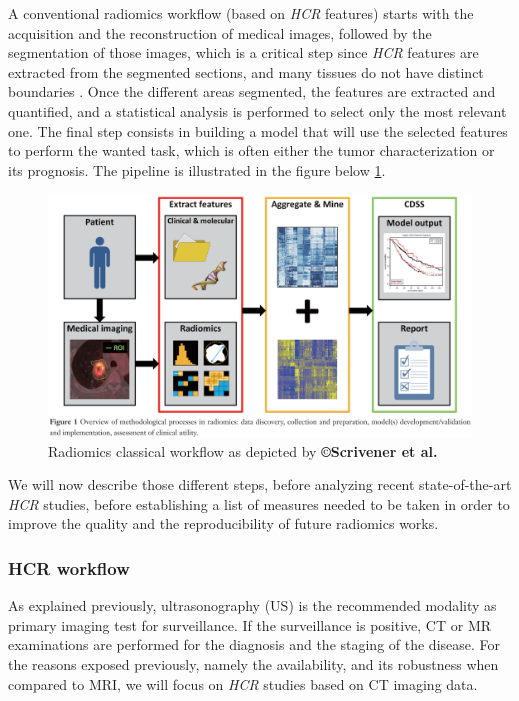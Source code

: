 \documentclass[]{article}
\begin{document}
A conventional radiomics workflow (based on \emph{HCR} features) starts
with the acquisition and the reconstruction of medical images, followed
by the segmentation of those images, which is a critical step since
\emph{HCR} features are extracted from the segmented sections, and many
tissues do not have distinct boundaries \cite{Gillies2016}. Once the different areas segmented, the features are
extracted and quantified, and a statistical analysis is performed to
select only the most relevant one. The final step consists in building a
model that will use the selected features to perform the wanted task,
which is often either the tumor characterization or its prognosis. The
pipeline is illustrated in the figure below \ref{Scrivener2016_Fig1}.


\begin{figure}[th!]
\centering
\includegraphics[width=0.7\linewidth]{images/image4}
\caption{Radiomics classical workflow as depicted by \textbf{©Scrivener et al.} \cite{Scrivener2016}}
\label{Scrivener2016_Fig1}
\end{figure}


We will now describe those different steps, before analyzing recent
state-of-the-art \emph{HCR} studies, before establishing a list of
measures needed to be taken in order to improve the quality and the
reproducibility of future radiomics works.

\subsubsection*{HCR workflow}\label{hcr-workflow}

As explained previously, ultrasonography (US) is the recommended
modality as primary imaging test for surveillance. If the surveillance
is positive, CT or MR examinations are performed for the diagnosis and
the staging of the disease. For the reasons exposed previously, namely
the availability, and its robustness when compared to MRI, we will focus
on \emph{HCR} studies based on CT imaging data.
\end{document}
